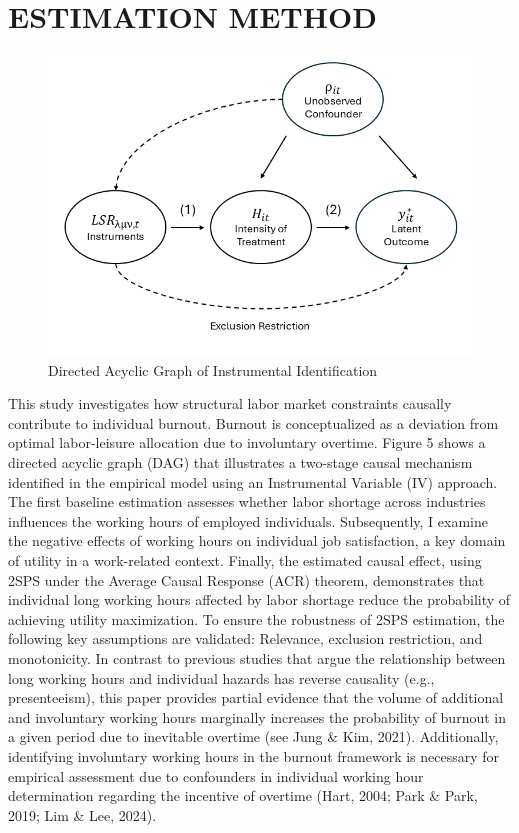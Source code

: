 \documentclass[
  12pt,
]{article}
\begin{document}
\newpage

\section{ESTIMATION METHOD}\label{estimation-method}

\begin{figure}
\centering
\includegraphics[width=5.20833in,height=\textheight,keepaspectratio]{DAG.png}
\caption{Directed Acyclic Graph of Instrumental Identification}
\end{figure}

This study investigates how structural labor market constraints causally
contribute to individual burnout. Burnout is conceptualized as a
deviation from optimal labor-leisure allocation due to involuntary
overtime. Figure 5 shows a directed acyclic graph (DAG) that illustrates
a two-stage causal mechanism identified in the empirical model using an
Instrumental Variable (IV) approach. The first baseline estimation
assesses whether labor shortage across industries influences the working
hours of employed individuals. Subsequently, I examine the negative
effects of working hours on individual job satisfaction, a key domain of
utility in a work-related context. Finally, the estimated causal effect,
using 2SPS under the Average Causal Response (ACR) theorem, demonstrates
that individual long working hours affected by labor shortage reduce the
probability of achieving utility maximization. To ensure the robustness
of 2SPS estimation, the following key assumptions are validated:
Relevance, exclusion restriction, and monotonicity. In contrast to
previous studies that argue the relationship between long working hours
and individual hazards has reverse causality (e.g., presenteeism), this
paper provides partial evidence that the volume of additional and
involuntary working hours marginally increases the probability of
burnout in a given period due to inevitable overtime (see Jung \& Kim,
2021). Additionally, identifying involuntary working hours in the
burnout framework is necessary for empirical assessment due to
confounders in individual working hour determination regarding the
incentive of overtime (Hart, 2004; Park \& Park, 2019; Lim \& Lee,
2024).
\end{document}
